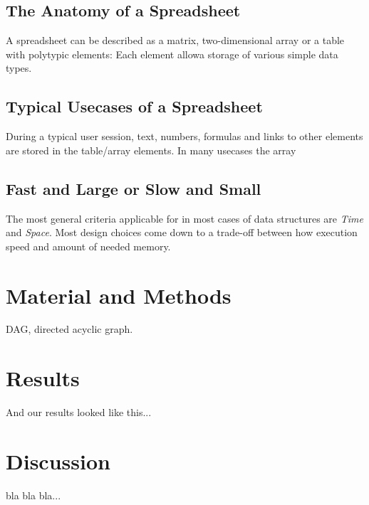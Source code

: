 \documentclass[a4paper,11pt,twoside]{article}
\begin{document}
\subsection{The Anatomy of a Spreadsheet}
A spreadsheet can be described as a matrix, two-dimensional array or a
table with polytypic elements: Each element allowa storage of various
simple data types. 

\subsection{Typical Usecases of a Spreadsheet}
During a typical user session, text, numbers,
formulas and links to other elements are stored in the table/array
elements. In many usecases the array 


\subsection{Fast and Large or Slow and Small}
The most general criteria applicable for in most cases of data
structures are \emph{Time} and \emph{Space}. Most design choices come
down to a trade-off between how execution speed and amount of needed
memory. 



\section{Material and Methods}
DAG, directed acyclic graph. 

\section{Results}
And our results looked like this...

\section{Discussion}

bla bla bla... 


\end{document}
